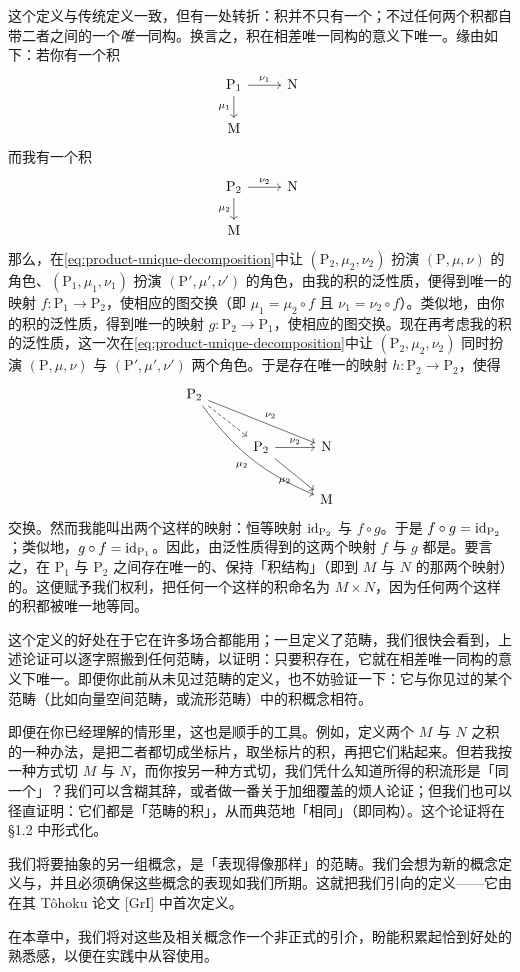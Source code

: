 这个定义与传统定义一致，但有一处转折：积并不只有一个；不过任何两个积都自带二者之间的一个\emph{唯一}同构。换言之，积在相差唯一同构的意义下唯一。缘由如下：若你有一个积
\[
\begin{tikzcd}[row sep=1.6em, column sep=2.4em]
\mathrm{P}_1 \ar[r,"\nu_1"] \ar[d,"\mu_1"'] & \mathrm{N} \\
\mathrm{M} &
\end{tikzcd}
\]
而我有一个积
\[
\begin{tikzcd}[row sep=1.6em, column sep=2.4em]
\mathrm{P}_2 \ar[r,"\nu_2"] \ar[d,"\mu_2"'] & \mathrm{N} \\
\mathrm{M} &
\end{tikzcd}
\]
那么，在\eqref{eq:product-unique-decomposition}中让 $(\mathrm{P}_2,\mu_2,\nu_2)$ 扮演 $(\mathrm{P},\mu,\nu)$ 的角色、$(\mathrm{P}_1,\mu_1,\nu_1)$ 扮演 $(\mathrm{P}',\mu',\nu')$ 的角色，由我的积的泛性质，便得到唯一的映射 $f\colon\mathrm{P}_1\to\mathrm{P}_2$，使相应的图交换（即 $\mu_1=\mu_2\circ f$ 且 $\nu_1=\nu_2\circ f$）。类似地，由你的积的泛性质，得到唯一的映射 $g\colon\mathrm{P}_2\to\mathrm{P}_1$，使相应的图交换。现在再考虑我的积的泛性质，这一次在\eqref{eq:product-unique-decomposition}中让 $(\mathrm{P}_2,\mu_2,\nu_2)$ 同时扮演 $(\mathrm{P},\mu,\nu)$ 与 $(\mathrm{P}',\mu',\nu')$ 两个角色。于是存在唯一的映射 $h\colon\mathrm{P}_2\to\mathrm{P}_2$，使得
\[
\begin{tikzcd}[row sep=2.2em, column sep=2.8em]
\mathrm{P}_2 \ar[drr,"\nu_2"] \ar[dr,dashed] \ar[ddrr,bend right=15,"\mu_2"'] & & \\
 & \mathrm{P}_2 \ar[r,"\nu_2"] \ar[dr,"\mu_2"'] & \mathrm{N} \\
 & & \mathrm{M}
\end{tikzcd}
\]
交换。然而我能叫出两个这样的映射：恒等映射 $\mathrm{id}_{\mathrm{P}_2}$ 与 $f\circ g$。于是 $f\circ g=\mathrm{id}_{\mathrm{P}_2}$；类似地，$g\circ f=\mathrm{id}_{\mathrm{P}_1}$。因此，由泛性质得到的这两个映射 $f$ 与 $g$ 都是\trBijection{}。要言之，在 $\mathrm{P}_1$ 与 $\mathrm{P}_2$ 之间存在唯一的、保持「积结构」（即到 $M$ 与 $N$ 的那两个映射）的\trBijection。这便赋予我们权利，把任何一个这样的积命名为 $M\times N$，因为任何两个这样的积都被唯一地等同。

这个定义的好处在于它在许多场合都能用；一旦定义了范畴，我们很快会看到，上述论证可以逐字照搬到任何范畴，以证明：只要积存在，它就在相差唯一同构的意义下唯一。即便你此前从未见过范畴的定义，也不妨验证一下：它与你见过的某个范畴（比如向量空间范畴，或流形范畴）中的积概念相符。

即便在你已经理解的情形里，这也是顺手的工具。例如，定义两个\trManifold{} $M$ 与 $N$ 之积的一种办法，是把二者都切成坐标片，取坐标片的积，再把它们粘起来。但若我按一种方式切 $M$ 与 $N$，而你按另一种方式切，我们凭什么知道所得的积流形是「同一个」？我们可以含糊其辞，或者做一番关于加细覆盖的烦人论证；但我们也可以径直证明：它们都是「范畴的积」，从而典范地「相同」（即同构）。这个论证将在 \S1.2 中形式化。

我们将要抽象的另一组概念，是「表现得像\trModule{}那样」的范畴。我们会想为新的概念定义\trKernel{}与\trCokernel，并且必须确保这些概念的表现如我们所期。这就把我们引向\trAbelianCategory{}的定义——它由\trGrothendieck{}在其 T\^ohoku 论文 [GrI] 中首次定义。

在本章中，我们将对这些及相关概念作一个非正式的引介，盼能积累起恰到好处的熟悉感，以便在实践中从容使用。

